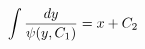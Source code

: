 \documentclass[preview]{standalone}
\begin{document}
\begin{align*}
\special{dvisvgm:raw <g id='unique000'>}\int \frac{dy}{\psi(y, C_1)} = x + C_2\special{dvisvgm:raw </g>}
\end{align*}
\end{document}
